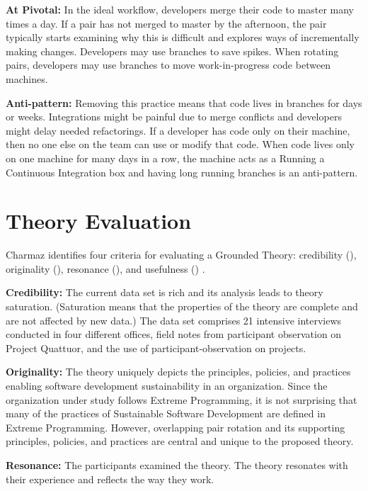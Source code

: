 \textbf{At Pivotal:} In the ideal workflow, developers merge their code to master many times a day. If a pair has not merged to master by the afternoon, the pair typically starts examining why this is difficult and explores ways of incrementally making changes. Developers may use branches to save spikes. When rotating pairs, developers may use branches to move work-in-progress code between machines. 

\textbf{Anti-pattern:} Removing this practice means that code lives in branches for days or weeks. Integrations might be painful due to merge conflicts and developers might delay needed refactorings. If a developer has code only on their machine, then no one else on the team can use or modify that code. When code lives only on one machine for many days in a row, the machine acts as a  Running a Continuous Integration box and having long running branches is an anti-pattern.
\section{Theory Evaluation}
\label{TheoryEvaluation}

Charmaz identifies four criteria for evaluating a Grounded Theory: credibility (), originality (), resonance (), and usefulness () \cite{StolGroundedTheory}. 

\textbf{Credibility:} The current data set is rich and its analysis leads to theory saturation. (Saturation means that the properties of the theory are complete and are not affected by new data.) The data set comprises 21 intensive interviews conducted in four different offices, field notes from participant observation on Project Quattuor, and the use of participant-observation on \numberOfObservedProjects{} projects.

\textbf{Originality:} The theory uniquely depicts the principles, policies, and practices enabling software development sustainability in an organization. Since the organization under study follows Extreme Programming, it is not surprising that many of the practices of Sustainable Software Development are defined in Extreme Programming. However, overlapping pair rotation and its supporting principles, policies, and practices are central and unique to the proposed theory.

\textbf{Resonance:} The participants examined the theory. The theory resonates with their experience and reflects the way they work.

